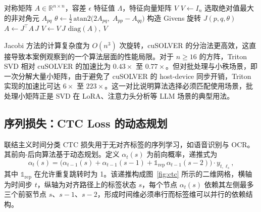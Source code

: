\begin{algorithm}[!htbp]
\caption{对称特征值分解的循环 Jacobi 算法}
\label{algo:jacobi}
\begin{algorithmic}[1]
\Require 对称矩阵 $A\in\mathbb{R}^{n\times n}$，容差 $\epsilon$
\Ensure 特征值 $\Lambda$，特征向量矩阵 $V$
\State $V \gets I_n$
  \State 选取绝对值最大的非对角元 $A_{pq}$
  \State $\theta \gets \tfrac{1}{2}\,\mathrm{atan2}\big(2 A_{pq},\; A_{pp}-A_{qq}\big)$
  \State 构造 Givens 旋转 $J(p,q,\theta)$
  \State $A \gets J^\top A\,J$ 
  \State $V \gets V\,J$ 
\EndWhile
\State \Return $\mathrm{diag}(A),\ V$
\end{algorithmic}
\end{algorithm}

Jacobi 方法的计算复杂度为 $O(n^3)$ 次旋转，cuSOLVER 的分治法更高效，这直接导致本案例观察到的一个算法层面的性能局限。对于 $n \geqslant 16$ 的方阵，Triton SVD 相对 cuSOLVER 的加速比为 $0.43\times$ 至 $0.77\times$。但对批处理与小秩场景，即一次分解大量小矩阵，由于避免了 cuSOLVER 的 host-device 同步开销，Triton 实现的加速比可达 $6\times$ 至 $223\times$。这一对比说明算法选择必须匹配使用场景，批处理小矩阵正是 SVD 在 LoRA、注意力头分析等 LLM 场景的典型用法。

\subsection{序列损失：CTC Loss 的动态规划}
联结主义时间分类 CTC 损失用于无对齐标签的序列学习，如语音识别与 OCR。其前向-后向算法基于动态规划。定义 $\alpha_t(s)$ 为前向概率，递推式为
\[
\alpha_t(s) = \big(\alpha_{t-1}(s) + \alpha_{t-1}(s-1) + \mathbb{1}_{\text{rep}}\,\alpha_{t-1}(s-2)\big)\cdot y_{t, \ell_s},
\]
其中 $\mathbb{1}_{\text{rep}}$ 在允许重复跳转时为 1。该递推构成图~\ref{fig:ctc} 所示的二维网格，横轴为时间步 $t$，纵轴为对齐路径上的标签状态 $s$，每个节点 $\alpha_t(s)$ 依赖其左侧最多三个前驱节点 $s$、$s-1$、$s-2$，形成时间维必须串行而标签维可以并行的依赖结构。

